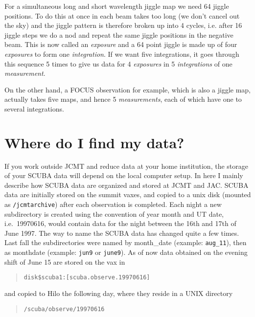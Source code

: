 \documentclass[twoside,11pt]{article}
\newenvironment{myquote}{\begin{quote}\begin{small}}{\end{small}\end{quote}}
\newcommand{\htmladdnormallink}[2]{#1}
\newcommand{\xlabel}[1]{}
\begin{document}
For a simultaneous long and short wavelength jiggle map we need 64 jiggle
positions. To do this at once in each beam takes too long (we don't cancel out
the sky) and the jiggle pattern is therefore broken up into 4 cycles,
i.e. after 16 jiggle steps we do a nod and repeat the same jiggle positions
in the negative beam. This is now called an {\it exposure} and a 64 point
jiggle is made up of four {\it exposures} to form one {\it integration}. If we
want five integrations, it goes through this sequence 5 times to give us data
for 4 {\it exposures} in 5 {\it integrations} of one {\it measurement}.

On the other hand, a FOCUS observation for example, which is also a
jiggle map, actually takes five maps, and hence 5 {\it measurements},
each of which have one to several integrations.


\section{\xlabel{where_do_i_find_may_data}Where do I find my data?}

If you work outside JCMT and reduce data at your home institution, the storage
of your SCUBA data will depend on the local computer setup. In here I mainly
describe how SCUBA data are organized and stored at JCMT and
\htmladdnormallink{JAC}{http://www.jach.hawaii.edu/}.  SCUBA data are initially
stored on the summit vaxes, and copied to a unix disk (mounted as
\texttt{/jcmtarchive}) after each observation is completed.  Each night a new
subdirectory is created using the convention of year month and UT date, i.e.\
19970616, would contain data for the night between the 16th and 17th of June
1997. The way to name the SCUBA data has changed quite a few times. Last fall
the subdirectories were named by month\_date (example: \texttt{aug\_11}), then
as monthdate (example: \texttt{jun9} or \texttt{june9}). As of now data
obtained on the evening shift of June 15 are stored on the vax in

\begin{myquote}
\begin{verbatim}
disk$scuba1:[scuba.observe.19970616]
\end{verbatim}  %
\end{myquote}

and copied to Hilo the following day, where they reside in a UNIX
directory

\begin{myquote}
\begin{verbatim}
/scuba/observe/19970616
\end{verbatim}
\end{myquote}
\end{document}
